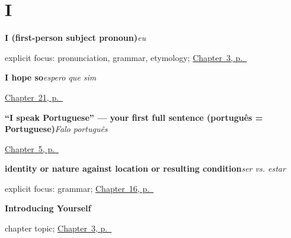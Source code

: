 \section*{I}

\noindent\begin{minipage}[t]{\linewidth}
\raggedright
\textbf{I (first-person subject pronoun)}\enspace\emph{eu}\par
\footnotesize explicit focus: pronunciation, grammar, etymology; \hyperref[ch:pt-introductions]{Chapter~3, p.~\pageref*{ch:pt-introductions}}
\end{minipage}\par\smallskip

\noindent\begin{minipage}[t]{\linewidth}
\raggedright
\textbf{I hope so}\enspace\emph{espero que sim}\par
\footnotesize \hyperref[ch:pt-bringing-getting-waiting-buying]{Chapter~21, p.~\pageref*{ch:pt-bringing-getting-waiting-buying}}
\end{minipage}\par\smallskip

\noindent\begin{minipage}[t]{\linewidth}
\raggedright
\textbf{\textquotedblleft{}I speak Portuguese\textquotedblright{} — your first full sentence (português = Portuguese)}\enspace\emph{Falo português}\par
\footnotesize \hyperref[ch:pt-first-verbs]{Chapter~5, p.~\pageref*{ch:pt-first-verbs}}
\end{minipage}\par\smallskip

\noindent\begin{minipage}[t]{\linewidth}
\raggedright
\textbf{identity or nature against location or resulting condition}\enspace\emph{ser vs. estar}\par
\footnotesize explicit focus: grammar; \hyperref[ch:pt-ser-and-estar]{Chapter~16, p.~\pageref*{ch:pt-ser-and-estar}}
\end{minipage}\par\smallskip

\noindent\begin{minipage}[t]{\linewidth}
\raggedright
\textbf{Introducing Yourself}\par
\footnotesize chapter topic; \hyperref[ch:pt-introductions]{Chapter~3, p.~\pageref*{ch:pt-introductions}}
\end{minipage}\par\smallskip

